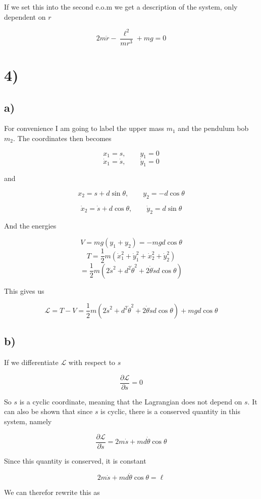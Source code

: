 \documentclass[a4paper,norsk, 10pt]{article}
\begin{document}
If we set this into the second e.o.m we get a description of the system, only dependent on $r$

$$
2m\ddot{r} - \frac{\ell ^2}{mr^3} + mg = 0
$$

\section*{4)}
\subsection*{a)}

For convenience I am going to label the upper mass $m_1$ and the pendulum bob $m_2$. The coordinates then becomes

$$
x_1 = s, \qquad y_1 = 0
$$
$$
\dot{x}_1 = \dot{s}, \qquad \dot{y}_1 = 0
$$

and

$$
x_2 =  s + d\sin \theta, \qquad y_2 = -d\cos \theta
$$

$$
\dot{x}_2 = \dot{s} + d\cos\theta,\qquad \dot{y}_2 = d\sin\theta
$$

And the energies

$$
V = mg(y_1 + y_2) = -mgd\cos\theta
$$
$$
T = \frac{1}{2}m(\dot{x}_1^2 + \dot{y}_1^2 + \dot{x}_2^2 + \dot{y}_2^2)
$$
$$
= \frac{1}{2}m(2\dot{s}^2 +d^2\dot{\theta}^2 + 2\dot{\theta}\dot{s}d\cos\theta) 
$$

This gives us

$$
\mathcal{L} = T -V = \frac{1}{2}m(2\dot{s}^2 +d^2\dot{\theta}^2 + 2\dot{\theta}\dot{s}d\cos\theta) +mgd\cos\theta
$$

\subsection*{b)}
If we differentiate $\mathcal{L}$ with respect to $s$

$$
\frac{\partial \mathcal{L}}{\partial s} = 0
$$

So $s$ is a cyclic coordinate, meaning that the Lagrangian does not depend on $s$. It can also be shown that since $s$ is cyclic, there is a conserved quantity in this system, namely

$$
\frac{\partial \mathcal{L}}{\partial \dot{s}} = 2m\dot{s} + md\dot{\theta}\cos\theta 
$$

Since this quantity is conserved, it is constant

$$
2m\dot{s} + md\dot{\theta}\cos\theta = \ell
$$

We can therefor rewrite this as 
\end{document}
